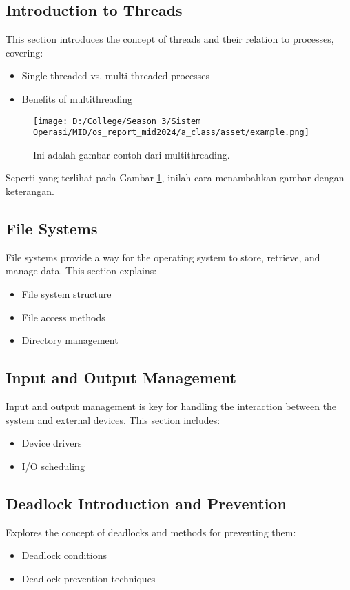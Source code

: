 \documentclass[12pt]{article}
\begin{document}
\subsection{Introduction to Threads}
This section introduces the concept of threads and their relation to processes, covering:
\begin{itemize}
    \item Single-threaded vs. multi-threaded processes
    \item Benefits of multithreading
\end{itemize}

\begin{figure}[h]
    \centering
    \texttt{[image: D:/College/Season 3/Sistem Operasi/MID/os\_report\_mid2024/a\_class/asset/example.png]}  %
    \caption{Ini adalah gambar contoh dari multithreading.}
    \label{fig:contoh_gambar}
\end{figure}

Seperti yang terlihat pada Gambar \ref{fig:contoh_gambar}, inilah cara menambahkan gambar dengan keterangan.

\subsection{File Systems}
File systems provide a way for the operating system to store, retrieve, and manage data. This section explains:
\begin{itemize}
    \item File system structure
    \item File access methods
    \item Directory management
\end{itemize}

\subsection{Input and Output Management}
Input and output management is key for handling the interaction between the system and external devices. This section includes:
\begin{itemize}
    \item Device drivers
    \item I/O scheduling
\end{itemize}

\subsection{Deadlock Introduction and Prevention}
Explores the concept of deadlocks and methods for preventing them:
\begin{itemize}
    \item Deadlock conditions
    \item Deadlock prevention techniques
\end{itemize}
\end{document}
